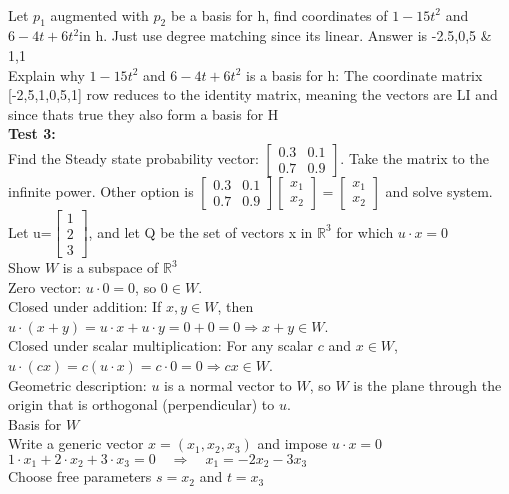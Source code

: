 \documentclass{article}
\begin{document}
\begin{multicols*}{2}
\\Let $p_1$ augmented with $p_2$ be a basis for h, find coordinates of $1-15t^2$ and $6-4t+6t^2$in h. Just use degree matching since its linear. Answer is -2.5,0,5 \& 1,1
\\Explain why $1-15t^2$ and $6-4t+6t^2$ is a basis for h: The coordinate matrix [-2,5,1,0,5,1] row reduces to the identity matrix, meaning the vectors are LI and since thats true they also form a basis for H
\\\textbf{Test 3:} 
\\Find the Steady state probability vector: $\begin{bmatrix}0.3&0.1\\0.7&0.9\end{bmatrix}$. Take the matrix to the infinite power. Other option is $\begin{bmatrix}0.3&0.1\\0.7&0.9\end{bmatrix}\begin{bmatrix}x_1\\x_2\end{bmatrix}=\begin{bmatrix}x_1\\x_2\end{bmatrix}$ and solve system.
\\Let u=$\begin{bmatrix}1\\2\\3\end{bmatrix}$, and let Q be the set of vectors x in $\mathbb{R}^3$ for which $u \cdot x = 0$
\\Show $W$ is a subspace of $\mathbb{R}^3$\\
Zero vector: $u\cdot 0=0$, so $0\in W$.
\\Closed under addition: If $x,y\in W$, then $u\cdot(x+y)=u\cdot x+u\cdot y=0+0=0\Rightarrow x+y\in W$.
\\Closed under scalar multiplication: For any scalar $c$ and $x\in W$, $u\cdot(cx)=c(u\cdot x)=c\cdot0=0\Rightarrow cx\in W$.
\\Geometric description: $u$ is a normal vector to $W$, so $W$ is the plane through the origin that is orthogonal (perpendicular) to $u$.
\\Basis for $W$
\\Write a generic vector $x=(x_1,x_2,x_3)$ and impose $u\cdot x=0$
\\$1\cdot x_1 + 2\cdot x_2 + 3\cdot x_3 = 0 \quad\Longrightarrow\quad x_1 = -2x_2 - 3x_3$
\\Choose free parameters $s=x_2$ and $t=x_3$

\end{multicols*}
\end{document}
